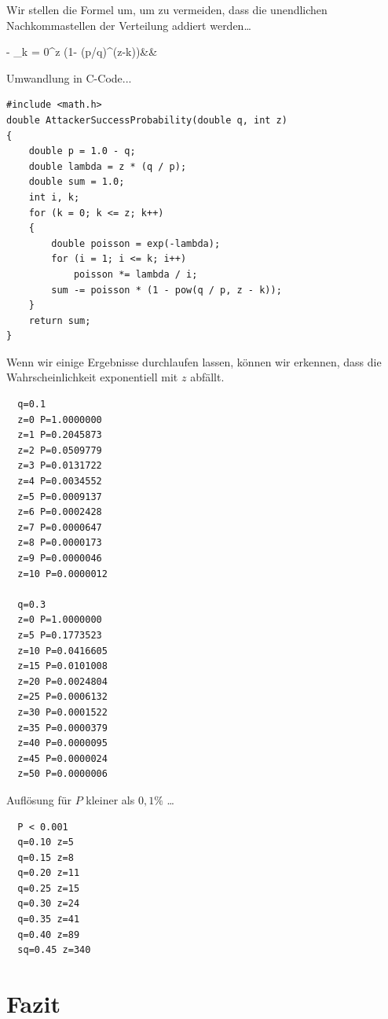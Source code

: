 \documentclass[9pt]{article}
\begin{document}
	\noindent Wir stellen die Formel um, um zu vermeiden, dass die unendlichen Nachkommastellen der Verteilung addiert werden…
	
	\begin{flalign*}
 - \sum_{k = 0}^{z}  (1- (p/q)^{(z-k)})&&
	\end{flalign*}
	\vspace{2mm}
	
	\noindent Umwandlung in C-Code...
	
	\begin{verbatim}
#include <math.h>
double AttackerSuccessProbability(double q, int z)
{
    double p = 1.0 - q;
    double lambda = z * (q / p);
    double sum = 1.0;
    int i, k;
    for (k = 0; k <= z; k++)
    {
        double poisson = exp(-lambda);
        for (i = 1; i <= k; i++)
            poisson *= lambda / i;
        sum -= poisson * (1 - pow(q / p, z - k));
    }
    return sum;
}
	\end{verbatim}
	
	\newpage
	
	\noindent Wenn wir einige Ergebnisse durchlaufen lassen, können wir erkennen, dass die Wahrscheinlichkeit exponentiell mit $z$ abfällt.
	
	\begin{verbatim}
  q=0.1
  z=0 P=1.0000000
  z=1 P=0.2045873
  z=2 P=0.0509779
  z=3 P=0.0131722
  z=4 P=0.0034552
  z=5 P=0.0009137
  z=6 P=0.0002428
  z=7 P=0.0000647
  z=8 P=0.0000173
  z=9 P=0.0000046
  z=10 P=0.0000012

  q=0.3
  z=0 P=1.0000000
  z=5 P=0.1773523
  z=10 P=0.0416605
  z=15 P=0.0101008
  z=20 P=0.0024804
  z=25 P=0.0006132
  z=30 P=0.0001522
  z=35 P=0.0000379
  z=40 P=0.0000095
  z=45 P=0.0000024
  z=50 P=0.0000006
	\end{verbatim}
	
	\noindent Auflösung für $P$ kleiner als $0,1\%$ …
	
	\begin{verbatim}
  P < 0.001
  q=0.10 z=5
  q=0.15 z=8
  q=0.20 z=11
  q=0.25 z=15
  q=0.30 z=24
  q=0.35 z=41
  q=0.40 z=89
  sq=0.45 z=340
	\end{verbatim}
	
	\section{Fazit}
	
\end{document}
